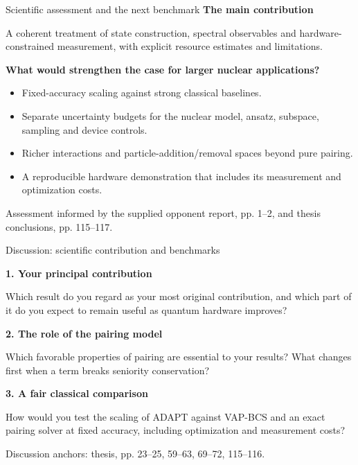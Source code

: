 \documentclass[11pt,aspectratio=169]{beamer}
\newcommand{\src}[1]{\par\vfill{\fontsize{7}{8}\selectfont\color{gray}#1\par}}
\newcommand{\question}[3]{\par\medskip\textbf{#1. #2}\par\smallskip #3\par}
\begin{document}
\begin{frame}{Scientific assessment and the next benchmark}
\textbf{The main contribution}\par
A coherent treatment of state construction, spectral observables and hardware-constrained measurement, with explicit resource estimates and limitations.\par
\medskip
\textbf{What would strengthen the case for larger nuclear applications?}
\begin{itemize}\setlength\itemsep{.55em}
\item Fixed-accuracy scaling against strong classical baselines.
\item Separate uncertainty budgets for the nuclear model, ansatz, subspace, sampling and device controls.
\item Richer interactions and particle-addition/removal spaces beyond pure pairing.
\item A reproducible hardware demonstration that includes its measurement and optimization costs.
\end{itemize}
\src{Assessment informed by the supplied opponent report, pp. 1--2, and thesis conclusions, pp. 115--117.}
\end{frame}

\begin{frame}{Discussion: scientific contribution and benchmarks}
\question{1}{Your principal contribution}{Which result do you regard as your most original contribution, and which part of it do you expect to remain useful as quantum hardware improves?}
\question{2}{The role of the pairing model}{Which favorable properties of pairing are essential to your results? What changes first when a term breaks seniority conservation?}
\question{3}{A fair classical comparison}{How would you test the scaling of ADAPT against VAP-BCS and an exact pairing solver at fixed accuracy, including optimization and measurement costs?}
\src{Discussion anchors: thesis, pp. 23--25, 59--63, 69--72, 115--116.}
\end{frame}
\end{document}

